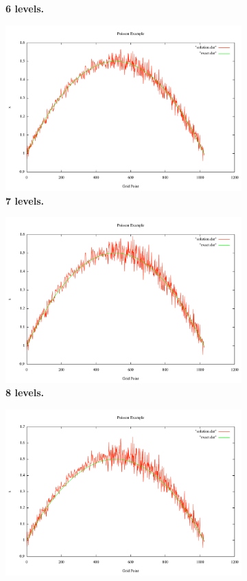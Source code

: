 \documentclass[note]{TechNote}
\begin{document}
\begin{figure}[h!]
\begin{subfigure}[b]{0.32\textwidth}
    \caption{\textbf{6 levels.}}
  \end{subfigure}
  \begin{subfigure}[b]{0.32\textwidth}
    \includegraphics[width=\textwidth]{7_sec_7_level.pdf}
    \caption{\textbf{7 levels.}}
  \end{subfigure}
  \begin{subfigure}[b]{0.32\textwidth}
    \includegraphics[width=\textwidth]{7_sec_8_level.pdf}
    \caption{\textbf{8 levels.}}
  \end{subfigure}
  \begin{subfigure}[b]{0.32\textwidth}
    \includegraphics[width=\textwidth]{7_sec_9_level.pdf}

\end{subfigure}
\end{figure}
\end{document}
